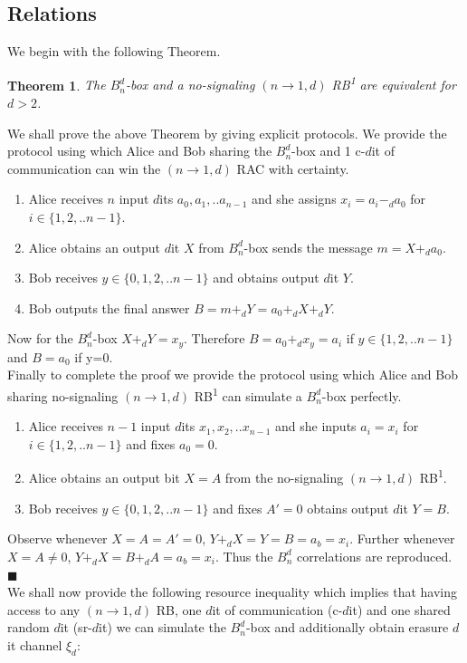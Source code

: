 \documentclass[%
 reprint,
 amsmath,amssymb,
 aps,
]{revtex4-1}
\newtheorem{mydef1}{Theorem}
\begin{document}
\subsection*{Relations}
\noindent We begin with the following Theorem.
\begin{mydef1} \label{thm4}
The $B_n^d$-box and a no-signaling $(n\rightarrow1,d)$ RB\textsuperscript{1} are equivalent for  $d>2$.
\end{mydef1}
We shall prove the above Theorem by giving explicit protocols.
We provide the protocol using which Alice and Bob sharing the $B_n^d$-box and 1 c-$d$it of communication can win the $(n\rightarrow1,d)$ RAC with certainty. 
\begin{enumerate}
\item Alice receives $n$ input $d$its $a_0,a_1,..a_{n-1}$ and she assigns $x_i=a_i-_d a_0$ for $i\in\{1,2,..n-1\}$.
\item Alice obtains an output $d$it $X$ from $B_n^d$-box sends the message $m=X+_d a_0$.
\item Bob receives $y\in\{0,1,2,..n-1\}$ and obtains output $d$it  $Y$. 
\item Bob outputs the final answer $B=m+_dY=a_0+_d X +_d Y$.
\end{enumerate}
\noindent Now for the $B_n^d$-box $X+_d Y=x_y$. Therefore $B=a_0+_dx_y=a_i$ if $y\in\{1,2,..n-1\}$ and $B=a_0$ if y=0. \\
Finally to complete the proof we provide the protocol using which Alice and Bob sharing no-signaling $(n\rightarrow1,d)$ RB\textsuperscript{1} can simulate a $B_n^d$-box perfectly.
\begin{enumerate}
\item Alice receives $n-1$ input $d$its $x_1,x_2,..x_{n-1}$ and she inputs $a_i=x_i$ for $i\in\{1,2,..n-1\}$ and fixes $a_0=0$.
\item Alice obtains an output bit $X=A$ from the no-signaling $(n\rightarrow 1,d)$ RB\textsuperscript{1}.
\item Bob receives $y\in \{0,1,2,..n-1\}$ and fixes $A'=0$ obtains output $d$it  $Y=B$.
\end{enumerate}
\noindent  Observe whenever $X=A=A'=0$, $Y+_d X=Y=B=a_b=x_i$. Further whenever $X=A\neq 0$, $Y+_dX=B+_dA=a_b=x_i$. Thus the $B_n^d$ correlations are reproduced. $\blacksquare$ \\
We shall now provide the following resource inequality which implies that having access to any $(n\rightarrow1,d)$ RB, one $d$it of communication (c-$d$it) and one shared random $d$it (sr-$d$it) we can simulate the $B_n^d$-box and additionally obtain erasure $d$it channel $\xi_d$:
\end{document}
